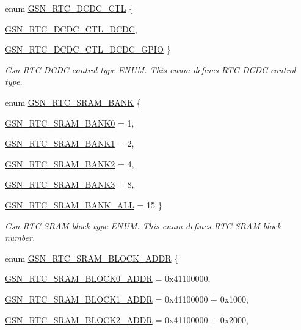 \begin{DoxyCompactItemize}
enum \hyperlink{a00651_ga9b99af1b9b8d009d88640121a1de2e9d}{GSN\_\-RTC\_\-DCDC\_\-CTL} \{ \par
\hyperlink{a00651_gga9b99af1b9b8d009d88640121a1de2e9daf3e684018015ab18cce64c594a75bd62}{GSN\_\-RTC\_\-DCDC\_\-CTL\_\-DCDC}, 
\par
\hyperlink{a00651_gga9b99af1b9b8d009d88640121a1de2e9da0ac25212aa150f2e80f8b0d4e956d763}{GSN\_\-RTC\_\-DCDC\_\-CTL\_\-DCDC\_\-GPIO}
 \}
\begin{DoxyCompactList}\small\item\em Gsn RTC DCDC control type ENUM. This enum defines RTC DCDC control type. \end{DoxyCompactList}\item 
enum \hyperlink{a00651_ga77c3be59f640309dc97a21e937aa9b3c}{GSN\_\-RTC\_\-SRAM\_\-BANK} \{ \par
\hyperlink{a00651_gga77c3be59f640309dc97a21e937aa9b3caa481224f5d0b2b672d7c38b1d3cc5383}{GSN\_\-RTC\_\-SRAM\_\-BANK0} =  1, 
\par
\hyperlink{a00651_gga77c3be59f640309dc97a21e937aa9b3caf3331fec66ab355fcd5fca5f462288e0}{GSN\_\-RTC\_\-SRAM\_\-BANK1} =  2, 
\par
\hyperlink{a00651_gga77c3be59f640309dc97a21e937aa9b3cacb7bb34d2570a60af50b8439087c8082}{GSN\_\-RTC\_\-SRAM\_\-BANK2} =  4, 
\par
\hyperlink{a00651_gga77c3be59f640309dc97a21e937aa9b3ca3627ad8546d0cfcb89da5f16d6679a70}{GSN\_\-RTC\_\-SRAM\_\-BANK3} =  8, 
\par
\hyperlink{a00651_gga77c3be59f640309dc97a21e937aa9b3ca26e2b1b8786c612a464c7b638e13c308}{GSN\_\-RTC\_\-SRAM\_\-BANK\_\-ALL} =  15
 \}
\begin{DoxyCompactList}\small\item\em Gsn RTC SRAM block type ENUM. This enum defines RTC SRAM block number. \end{DoxyCompactList}\item 
enum \hyperlink{a00651_gaec3839be6e64287f1c0981aafc08548b}{GSN\_\-RTC\_\-SRAM\_\-BLOCK\_\-ADDR} \{ \par
\hyperlink{a00651_ggaec3839be6e64287f1c0981aafc08548ba9645b34f89a1114967cc3273b138e76a}{GSN\_\-RTC\_\-SRAM\_\-BLOCK0\_\-ADDR} =  0x41100000, 
\par
\hyperlink{a00651_ggaec3839be6e64287f1c0981aafc08548ba0e2e7ff5dcf4d136ec56d8cd92e3c920}{GSN\_\-RTC\_\-SRAM\_\-BLOCK1\_\-ADDR} =  0x41100000 + 0x1000, 
\par
\hyperlink{a00651_ggaec3839be6e64287f1c0981aafc08548ba42da0e4e8aaee1e47cc8a6500816ee3b}{GSN\_\-RTC\_\-SRAM\_\-BLOCK2\_\-ADDR} =  0x41100000 + 0x2000, 

\end{DoxyCompactItemize}
